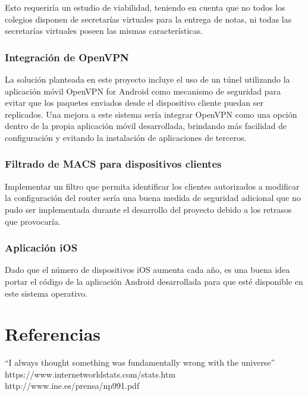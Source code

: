 \documentclass[12pt]{article}
\begin{document}
        Esto requeriría un estudio de viabilidad, teniendo en cuenta que no todos los colegios disponen de secretarías virtuales para la entrega de notas, ni todas las secretarías virtuales poseen las mismas características.

        \subsubsection{Integración de OpenVPN}
        La solución planteada en este proyecto incluye el uso de un túnel utilizando la aplicación móvil OpenVPN for Android como mecanismo de seguridad para evitar que los paquetes enviados desde el dispositivo cliente puedan ser replicados. Una mejora a este sistema sería integrar OpenVPN como una opción dentro de la propia aplicación móvil desarrollada, brindando más facilidad de configuración y evitando la instalación de aplicaciones de terceros.

        \subsubsection{Filtrado de MACS para dispositivos clientes}
        Implementar un filtro que permita identificar los clientes autorizados a modificar la configuración del router sería una buena medida de seguridad adicional que no pudo ser implementada durante el desarrollo del proyecto debido a los retrasos que provocaría.

        \subsubsection{Aplicación iOS}
        Dado que el número de dispositivos iOS aumenta cada año, es una buena idea portar el código de la aplicación Android desarrollada para que esté disponible en este sistema operativo.

\section{Referencias}
``I always thought something was fundamentally wrong with the universe'' \citep{adams1995hitchhiker}
https://www.internetworldstats.com/stats.htm \citep{hola}
http://www.ine.es/prensa/np991.pdf \citep{Menores que utilizan internet}

\end{document}

